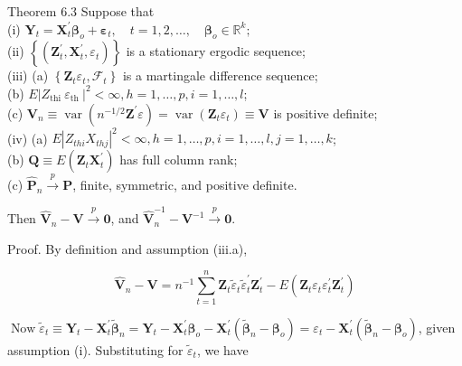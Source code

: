 \documentclass[10pt]{article}
\begin{document}
Theorem 6.3 Suppose that\\
(i) $\mathbf{Y}_{t}=\mathbf{X}_{t}^{\prime} \boldsymbol{\beta}_{o}+\boldsymbol{\varepsilon}_{t}, \quad t=1,2, \ldots, \quad \boldsymbol{\beta}_{o} \in \mathbb{R}^{k} ;$\\
(ii) $\left\{\left(\mathbf{Z}_{t}^{\prime}, \mathbf{X}_{t}^{\prime}, \varepsilon_{t}\right)\right\}$ is a stationary ergodic sequence;\\
(iii) (a) $\left\{\mathbf{Z}_{t} \varepsilon_{t}, \mathcal{F}_{t}\right\}$ is a martingale difference sequence;\\
(b) $E\left|Z_{\text {thi }} \varepsilon_{\text {th }}\right|^{2}<\infty, h=1, \ldots, p, i=1, \ldots, l$;\\
(c) $\mathbf{V}_{n} \equiv \operatorname{var}\left(n^{-1 / 2} \mathbf{Z}^{\prime} \varepsilon\right)=\operatorname{var}\left(\mathbf{Z}_{t} \varepsilon_{t}\right) \equiv \mathbf{V}$ is positive definite;\\
(iv) (a) $E\left|Z_{t h i} X_{t h j}\right|^{2}<\infty, h=1, \ldots, p, i=1, \ldots, l, j=1, \ldots, k$;\\
(b) $\mathbf{Q} \equiv E\left(\mathbf{Z}_{t} \mathbf{X}_{t}^{\prime}\right)$ has full column rank;\\
(c) $\hat{\mathbf{P}}_{n} \xrightarrow{p} \mathbf{P}$, finite, symmetric, and positive definite.

Then $\hat{\mathbf{V}}_{n}-\mathbf{V} \xrightarrow{p} \mathbf{0}$, and $\hat{\mathbf{V}}_{n}^{-1}-\mathbf{V}^{-1} \xrightarrow{p} \mathbf{0}$.

Proof. By definition and assumption (iii.a),

$$
\hat{\mathbf{V}}_{n}-\mathbf{V}=n^{-1} \sum_{t=1}^{n} \mathbf{Z}_{t} \tilde{\varepsilon}_{t} \tilde{\varepsilon}_{t}^{\prime} \mathbf{Z}_{t}^{\prime}-E\left(\mathbf{Z}_{t} \varepsilon_{t} \varepsilon_{t}^{\prime} \mathbf{Z}_{t}^{\prime}\right)
$$

$\operatorname{Now} \tilde{\varepsilon}_{t} \equiv \mathbf{Y}_{t}-\mathbf{X}_{t}^{\prime} \tilde{\boldsymbol{\beta}}_{n}=\mathbf{Y}_{t}-\mathbf{X}_{t}^{\prime} \boldsymbol{\beta}_{o}-\mathbf{X}_{t}^{\prime}\left(\tilde{\boldsymbol{\beta}}_{n}-\boldsymbol{\beta}_{o}\right)=\varepsilon_{t}-\mathbf{X}_{t}^{\prime}\left(\tilde{\boldsymbol{\beta}}_{n}-\boldsymbol{\beta}_{o}\right)$, given assumption (i). Substituting for $\tilde{\varepsilon}_{t}$, we have
\end{document}
